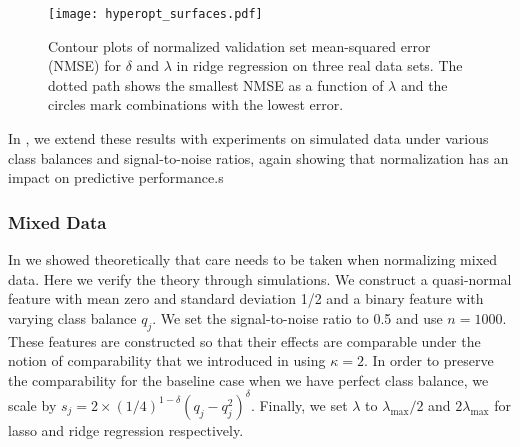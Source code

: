 
\begin{figure}[htpb]
  \centering
  \texttt{[image: hyperopt\_surfaces.pdf]}
  \caption{%
    Contour plots of normalized validation set mean-squared error (NMSE)
    for \(\delta\) and \(\lambda\) in ridge regression on
    three real data sets. The
    dotted path shows the smallest NMSE as a function of \(\lambda\) and the circles mark
    combinations with the lowest error.
  }
  \label{fig:hyperopt-contours}
\end{figure}


In , we extend these results with experiments on
simulated data under various class balances and signal-to-noise ratios, again showing that
normalization has an impact on predictive performance.s

\subsubsection{Mixed Data}\label{sec:experiments-mixed-data}

In  we showed theoretically that care needs to be taken when
normalizing mixed data. Here we verify the theory through simulations. We construct a
quasi-normal feature with mean zero and standard deviation 1/2 and a binary feature with
varying class balance \(q_j\). We set the signal-to-noise ratio to 0.5 and use \(n =
\num{1000}\). These features are constructed so that their effects are comparable under the
notion of comparability that we introduced in  using \(\kappa = 2\).
In order to preserve the comparability for the baseline case when we have perfect class
balance, we scale by \(s_j = 2 \times (1/4)^{1-\delta}(q_j-q_j^2)^\delta\). Finally, we set
\(\lambda\) to \(\lambda_\text{max}/2\) and \(2\lambda_\text{max}\) for lasso and ridge
regression respectively.

